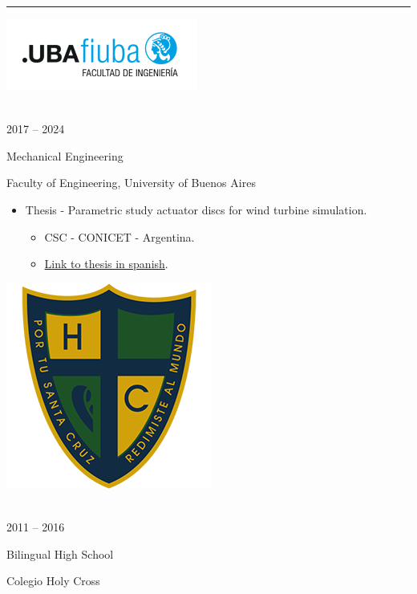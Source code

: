 \documentclass[a4paper,10pt]{article}
\newlength{\cvcolumngapwidth}
\newlength{\cvleftcolumnwidth}
\newlength{\cvrightcolumnwidth}
\newcommand{\cvsectionstyle}[1]{{\normalsize\cvsectionfont\textcolor{cvsectioncolor}{#1}}}
\newcommand{\cvtitlestyle}[1]{{\large\cvtitlefont\textcolor{cvtitlecolor}{#1}}}
\newcommand{\cvdurationstyle}[1]{{\small\cvdurationfont\textcolor{cvdurationcolor}{#1}}}
\newlength{\cvafteritemskipamount}
\newlength{\cvaftersectionskipamount}
\newlength{\cvaftertitleskipamount}
\newlength{\cvparskip}
\newcommand{\cvsection}[1]{
    \begin{minipage}[t]{\cvleftcolumnwidth}
        \raggedleft\cvsectionstyle{#1}
    \end{minipage}%
    \hspace{\cvcolumngapwidth}%
    \begin{minipage}[t]{\cvrightcolumnwidth}
        \textcolor{cvrulecolor}{\rule{\cvrightcolumnwidth}{0.3mm}}
    \end{minipage}

    \vspace{\cvaftersectionskipamount}
}
\newcommand{\cvitem}[2]{
    \begin{minipage}[t]{\cvleftcolumnwidth}
        \raggedleft #1
    \end{minipage}%
    \hspace{\cvcolumngapwidth}%
    \begin{minipage}[t]{\cvrightcolumnwidth}
        \setlength{\parskip}{\cvparskip} #2
    \end{minipage}

    \vspace{\cvafteritemskipamount}
}
\newcommand{\cvtitle}[1]{
    \cvtitlestyle{#1}

    \vspace{\cvaftertitleskipamount}
    \vspace{-\cvparskip}
}
\begin{document}

\cvsection{EDUCATION}

\cvitem{
 	\begin{minipage}{\textwidth}
   \begin{flushright}
		  \includegraphics[height=0.25\textwidth]{../../../../logos-photos/Logo_FIUBA_new.png}   
    \end{flushright}  
  \end{minipage} \\
  \vspace{0.1cm}
  \cvdurationstyle{2017 -- 2024}
}{
  \cvtitle{Mechanical Engineering}

    Faculty of Engineering, University of Buenos Aires
    
    \begin{itemize}[leftmargin=*]
       \item \textsf{Thesis - Parametric study actuator discs for wind turbine simulation.} 
        \begin{itemize}
          \item CSC - CONICET - Argentina.
          \item \href{https://drive.google.com/file/d/1TWklGPKCdaIwJHuOc-fqAFvFS9hN7_sT/view?usp=sharing}{Link to thesis in spanish}.
        \end{itemize}
    \end{itemize}
}


\cvitem{
    \begin{minipage}{\textwidth}
        \flushright
        \includegraphics[height=0.2\textwidth]{../../../../logos-photos/Logo_HC.png}   
    \end{minipage}\\  
    \vspace{0.1cm}
    \cvdurationstyle{2011 -- 2016}
}{
    \cvtitle{Bilingual High School}

    Colegio Holy Cross
}
\end{document}
